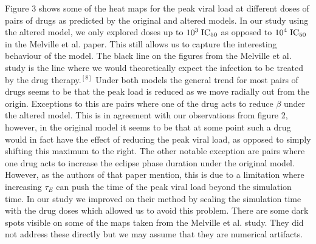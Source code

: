 \documentclass[a4paper,11pt]{article}
\begin{document}
Figure 3 shows some of the heat maps for the peak viral load at different doses of pairs of drugs as predicted by the original and altered models. In our study using the altered model, we only explored doses up to $10^3 \hspace{1mm} \mathrm{IC}_{50}$ as opposed to $10^4 \hspace{1mm} \mathrm{IC}_{50}$ in the Melville et al. paper. This still allows us to capture the interesting behaviour of the model. The black line on the figures from the Melville et al. study is the line where we would theoretically expect the infection to be treated by the drug therapy.$^{[8]}$  Under both models the general trend for most pairs of drugs seems to be that the peak load is reduced as we move radially out from the origin. Exceptions to this are pairs where one of the drug acts to reduce $\beta$ under the altered model. This is in agreement with our observations from figure 2, however, in the original model it seems to be that at some point such a drug would in fact have the effect of reducing the peak viral load, as opposed to simply shifting this maximum to the right. The other notable exception are pairs where one drug acts to increase the eclipse phase duration under the original model. However, as the authors of that paper mention, this is due to a limitation where increasing $\tau_E$ can push the time of the peak viral load beyond the simulation time. In our study we improved on their method by scaling the simulation time with the drug doses which allowed us to avoid this problem. There are some dark spots visible on some of the maps taken from the Melville et al. study. They did not address these directly but we may assume that they are numerical artifacts.
\end{document}
